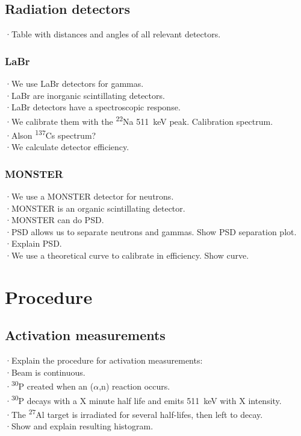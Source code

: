 \documentclass[a4paper,12pt]{report}
\newcommand{\an}{($\alpha$,n) }
\newcommand{\Aliso}{\textsuperscript{27}Al }
\newcommand{\Piso}{\textsuperscript{30}P }
\newcommand{\Na}{\textsuperscript{22}Na }
\begin{document}
\subsection{Radiation detectors}
·Table with distances and angles of all relevant detectors.\\

\subsubsection{LaBr}
·We use LaBr detectors for gammas.\\
·LaBr are inorganic scintillating detectors.\\
·LaBr detectors have a spectroscopic response.\\

·We calibrate them with the \Na \qty{511}{\keV} peak. Calibration spectrum.\\
·Alson \textsuperscript{137}Cs spectrum?\\
·We calculate detector efficiency.\\

\subsubsection{MONSTER}
·We use a MONSTER detector for neutrons.\\
·MONSTER is an organic scintillating detector.\\
·MONSTER can do PSD.\\
·PSD allows us to separate neutrons and gammas. Show PSD separation plot.\\
·Explain PSD.\\
·We use a theoretical curve to calibrate in efficiency. Show curve.\\

\section{Procedure}
\subsection{Activation measurements}
·Explain the procedure for activation measurements:\\
·Beam is continuous.\\
·\Piso created when an \an reaction occurs.\\
·\Piso decays with a X minute half life and emits \qty{511}{\keV} with X intensity.\\
·The \Aliso target is irradiated for several half-lifes, then left to decay.\\
·Show and explain resulting histogram.\\
\end{document}
